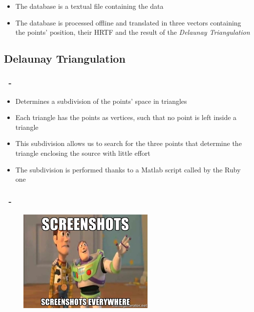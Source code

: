 \documentclass{beamer}
\begin{document}
	\begin{frame}
		\frametitle{\insertsection}
		\begin{itemize}
			\item The database is a textual file containing the data
			\item The database is processed offline and translated in three vectors containing the
				points' position, their HRTF and the result of the {\em Delaunay Triangulation}
		\end{itemize}
	\end{frame}

	\subsection{Delaunay Triangulation}

	\begin{frame}
		\frametitle{\insertsection\ - \insertsubsection}
		\begin{itemize}
			\item Determines a subdivision of the points' space in triangles
			\item Each triangle has the points as vertices, such that no point is left inside a triangle
			\item This subdivision allows us to search for the three points that determine the triangle enclosing the
				source with little effort
			\item The subdivision is performed thanks to a Matlab script called by the Ruby one
		\end{itemize}
	\end{frame}

	\begin{frame}
		\frametitle{\insertsection\ - \insertsubsection}
		\begin{figure}
			\centering
			  \includegraphics[width=0.6\textwidth]{images/marine.jpg}
		\end{figure}
	\end{frame}
\end{document}
